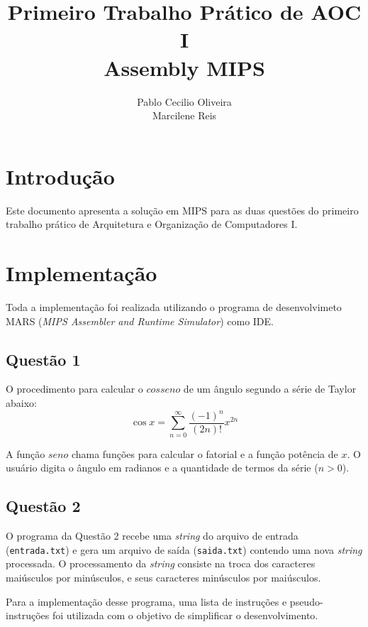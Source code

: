 \documentclass[12pt,a4paper]{article}
\author{Pablo Cecilio Oliveira\\
Marcilene Reis}
\title{Primeiro Trabalho Prático de AOC I\\
Assembly MIPS}
\date{}
\numberwithin{figure}{subsection}
\numberwithin{table}{subsection}
\begin{document}
\maketitle

\section{Introdução}

Este documento apresenta a solução em MIPS para as duas questões do primeiro trabalho prático de Arquitetura e Organização de Computadores I.

\section{Implementação}

Toda a implementação foi realizada utilizando o programa de desenvolvimeto MARS (\textit{MIPS Assembler and Runtime Simulator}) como IDE.

\subsection{Questão 1}

O procedimento para calcular o $cosseno$ de um ângulo segundo a série de Taylor abaixo:
\[ \cos x = \sum_{n=0}^{\infty} \frac{(-1)^n}{(2n)!} x^{2n} \]

A função $seno$ chama funções para calcular o fatorial e a função potência de $x$. O usuário digita o ângulo em radianos e a quantidade de termos da série ($n>0$).

\subsection{Questão 2}

O programa da Questão 2 recebe uma \textit{string} do arquivo de entrada (\texttt{entrada.txt}) e gera um arquivo de saída (\texttt{saida.txt}) contendo uma nova \textit{string} processada. O processamento da \textit{string} consiste na troca dos caracteres maiúsculos por minúsculos, e seus caracteres minúsculos por maiúsculos.

Para a implementação desse programa, uma lista de instruções e pseudo-instruções foi utilizada com o objetivo de simplificar o desenvolvimento.
\end{document}
